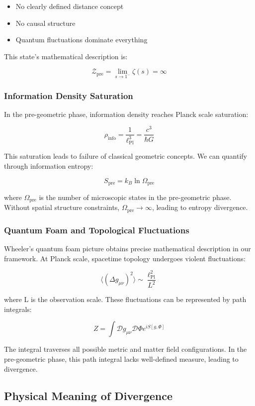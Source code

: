 \documentclass[12pt,a4paper]{article}
\begin{document}
\begin{itemize}
\item No clearly defined distance concept
\item No causal structure
\item Quantum fluctuations dominate everything
\end{itemize}

This state's mathematical description is:

$$\mathcal{Z}_{\text{pre}} = \lim_{s \to 1^-} \zeta(s) = \infty$$

\subsubsection{Information Density Saturation}

In the pre-geometric phase, information density reaches Planck scale saturation:

$$\rho_{\text{info}} = \frac{1}{\ell_{\text{Pl}}^3} = \frac{c^3}{\hbar G}$$

This saturation leads to failure of classical geometric concepts. We can quantify through information entropy:

$$S_{\text{pre}} = k_B \ln \Omega_{\text{pre}}$$

where $\Omega_{\text{pre}}$ is the number of microscopic states in the pre-geometric phase. Without spatial structure constraints, $\Omega_{\text{pre}} \to \infty$, leading to entropy divergence.

\subsubsection{Quantum Foam and Topological Fluctuations}

Wheeler's quantum foam picture obtains precise mathematical description in our framework. At Planck scale, spacetime topology undergoes violent fluctuations:

$$\langle (\Delta g_{\mu\nu})^2 \rangle \sim \frac{\ell_{\text{Pl}}^2}{L^2}$$

where L is the observation scale. These fluctuations can be represented by path integrals:

$$Z = \int \mathcal{D}g_{\mu\nu} \mathcal{D}\Phi e^{iS[g,\Phi]}$$

The integral traverses all possible metric and matter field configurations. In the pre-geometric phase, this path integral lacks well-defined measure, leading to divergence.

\subsection{Physical Meaning of Divergence}
\end{document}
